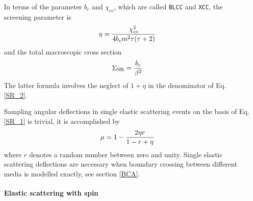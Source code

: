 In terms of the parameter $b_c$ and $\chi_{cc}$, 
which are called {\tt BLCC} and {\tt XCC},  
the screening parameter is 
\begin{equation}
\label{calc_eta}
\eta = {\chi_{cc}^2 \over 4 b_c m^2 \tau (\tau + 2)}
\end{equation}
and the total macroscopic cross section 
\begin{equation}
\label{SR_tot}
\Sigma_{\rm SR} = {b_c \over \beta^2}
\end{equation}
The latter formula involves the neglect of $1 + \eta$ in the denominator 
of Eq. \eqref{SR_2}.

Sampling angular deflections in single elastic scattering events 
on the basis of Eq. \eqref{SR_1} is trivial, it is accomplished by 
\begin{equation}
\label{sample_SR}
\mu = 1 - {2 \eta r \over 1 - r + \eta}
\end{equation}
where $r$ denotes a random number between zero and unity. 
Single elastic scattering deflections are necessary when 
boundary crossing between different media is modelled exactly, 
see section \ref{BCA}. 

\paragraph{Elastic scattering with spin} \hfill
\label{spin_elastic}

